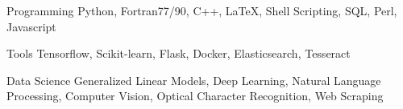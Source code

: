 


\begin{cvskills}








\cvskill
{Programming} %
{Python, Fortran77/90, C++, LaTeX, Shell Scripting, SQL, Perl, Javascript} %


\cvskill
{Tools} %
{Tensorflow, Scikit-learn, Flask, Docker, Elasticsearch, Tesseract} %



\cvskill
{Data Science} %
{Generalized Linear Models, Deep Learning, Natural Language Processing, Computer Vision, Optical Character Recognition, Web Scraping} %






\end{cvskills}
